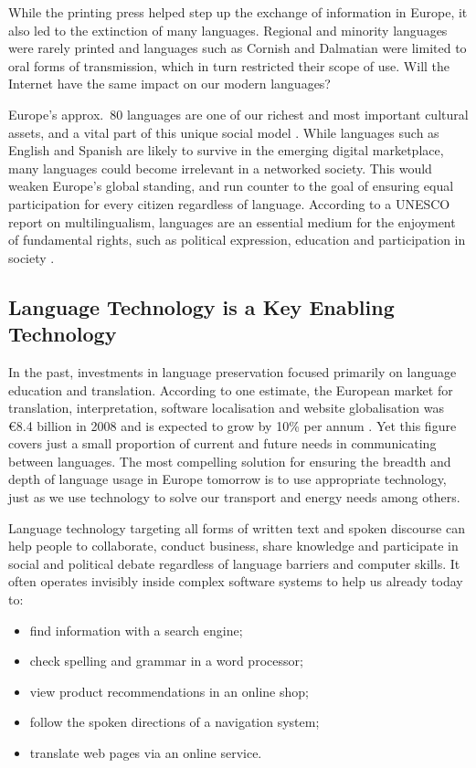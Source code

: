 \documentclass[]{../../metanetpaper}
\begin{document}
\begin{multicols}{2}
While the printing press helped step up the exchange of information in Europe, it also led to the extinction of many languages. Regional and minority languages were rarely printed and languages such as Cornish and Dalmatian were limited to oral forms of transmission, which in turn restricted their scope of use. Will the Internet have the same impact on our modern languages?


Europe’s approx.~80 languages are one of our richest and most important cultural assets, and a vital part of this unique social model \cite{EC2}. While languages such as English and Spanish are likely to survive in the emerging digital marketplace, many languages could become irrelevant in a networked society. This would weaken Europe’s global standing, and run counter to the goal of ensuring equal participation for every citizen regardless of language. According to a UNESCO report on multilingualism, languages are an essential medium for the enjoyment of fundamental rights, such as political expression, education and participation in society \cite{Unesco1}.

\subsection{Language Technology is a Key Enabling Technology}

In the past, investments in language preservation focused primarily on language education and translation. According to one estimate, the European market for translation, interpretation, software localisation and website globalisation was €8.4 billion in 2008 and is expected to grow by 10\% per annum \cite{EC3}. Yet this figure covers just a small proportion of current and future needs in communicating between languages. The most compelling solution for ensuring the breadth and depth of language usage in Europe tomorrow is to use appropriate technology, just as we use technology to solve our transport and energy needs among others.

Language technology targeting all forms of written text and spoken discourse can help people to collaborate, conduct business, share knowledge and participate in social and political debate regardless of language barriers and computer skills. It often operates invisibly inside complex software systems to help us already today to:

\begin{itemize}
\item find information with a search engine;
\item check spelling and grammar in a word processor;
\item view product recommendations in an online shop;
\item follow the spoken directions of a navigation system;
\item translate web pages via an online service.
\end{itemize}


\end{multicols}
\end{document}
